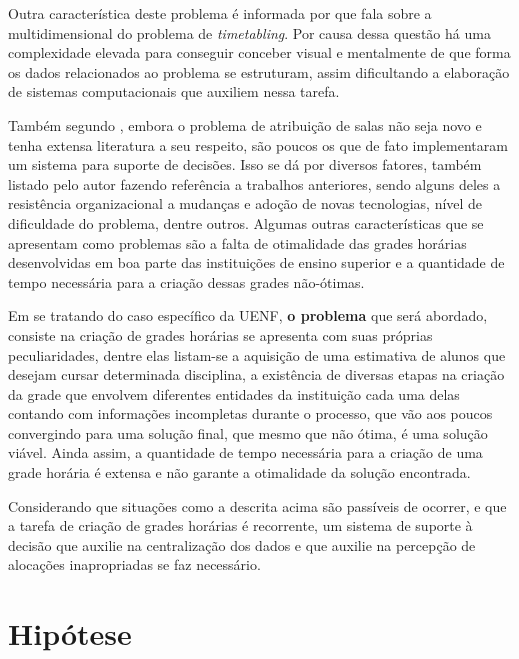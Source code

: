 Outra característica deste problema é informada por  que fala sobre a multidimensional do problema de \textit{timetabling}. Por causa dessa questão há uma complexidade elevada para conseguir conceber visual e mentalmente de que forma os dados relacionados ao problema se estruturam, assim dificultando a elaboração de sistemas computacionais que auxiliem nessa tarefa.

Também segundo , embora o problema de atribuição de salas não seja novo e tenha extensa literatura a seu respeito, são poucos os que de fato implementaram um sistema para suporte de decisões. Isso se dá por diversos fatores, também listado pelo autor fazendo referência a trabalhos anteriores, sendo alguns deles a resistência organizacional a mudanças e adoção de novas tecnologias, nível de dificuldade do problema, dentre outros. Algumas outras características que se apresentam como problemas são a falta de otimalidade das grades horárias desenvolvidas em boa parte das instituições de ensino superior e a quantidade de tempo necessária para a criação dessas grades não-ótimas.

Em se tratando do caso específico da UENF, \textbf{o problema} que será abordado, consiste na criação de grades horárias se apresenta com suas próprias peculiaridades, dentre elas listam-se a aquisição de uma estimativa de alunos que desejam cursar determinada disciplina, a existência de diversas etapas na criação da grade que envolvem diferentes entidades da instituição cada uma delas contando com informações incompletas durante o processo, que vão aos poucos convergindo para uma solução final, que mesmo que não ótima, é uma solução viável. Ainda assim, a quantidade de tempo necessária para a criação de uma grade horária é extensa e não garante a otimalidade da solução encontrada.

Considerando que situações como a descrita acima são passíveis de ocorrer, e que a tarefa de criação de grades horárias é recorrente, um sistema de suporte à decisão que auxilie na centralização dos dados e que auxilie na percepção de alocações inapropriadas se faz necessário.

\section{Hipótese} \label{sec:Hipótese}                  %

